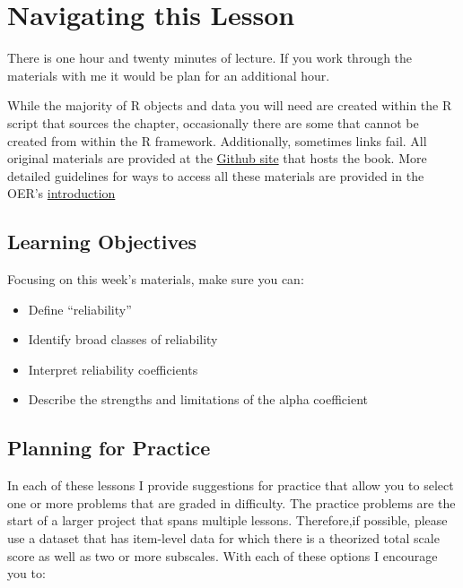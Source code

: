 \documentclass[
  english,
]{book}
\providecommand{\tightlist}{%
  \setlength{\itemsep}{0pt}\setlength{\parskip}{0pt}}
\begin{document}
\hypertarget{navigating-this-lesson-3}{%
\section{Navigating this Lesson}\label{navigating-this-lesson-3}}

There is one hour and twenty minutes of lecture. If you work through the materials with me it would be plan for an additional hour.

While the majority of R objects and data you will need are created within the R script that sources the chapter, occasionally there are some that cannot be created from within the R framework. Additionally, sometimes links fail. All original materials are provided at the \href{https://github.com/lhbikos/ReC_Psychometrics}{Github site} that hosts the book. More detailed guidelines for ways to access all these materials are provided in the OER's \protect\hyperlink{ReCintro}{introduction}

\hypertarget{learning-objectives-3}{%
\subsection{Learning Objectives}\label{learning-objectives-3}}

Focusing on this week's materials, make sure you can:

\begin{itemize}
\tightlist
\item
  Define ``reliability''
\item
  Identify broad classes of reliability
\item
  Interpret reliability coefficients
\item
  Describe the strengths and limitations of the alpha coefficient
\end{itemize}

\hypertarget{planning-for-practice-3}{%
\subsection{Planning for Practice}\label{planning-for-practice-3}}

In each of these lessons I provide suggestions for practice that allow you to select one or more problems that are graded in difficulty. The practice problems are the start of a larger project that spans multiple lessons. Therefore,if possible, please use a dataset that has item-level data for which there is a theorized total scale score as well as two or more subscales. With each of these options I encourage you to:
\end{document}
